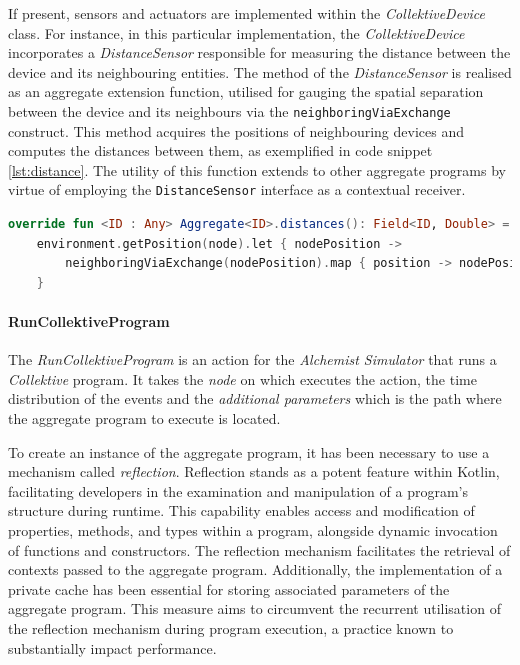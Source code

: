 If present, sensors and actuators are implemented within the \emph{CollektiveDevice} class.
For instance, in this particular implementation, the \emph{CollektiveDevice} incorporates a \emph{DistanceSensor} responsible for
measuring the distance between the device and its neighbouring entities.
The method of the \emph{DistanceSensor} is realised as an aggregate extension function, utilised for gauging the spatial
separation between the device and its neighbours via the \texttt{neighboringViaExchange} construct.
This method acquires the positions of neighbouring devices and computes the distances between them, as exemplified in code snippet \ref{lst:distance}.
The utility of this function extends to other aggregate programs by virtue of employing the \texttt{DistanceSensor} interface as a contextual receiver.

\begin{lstlisting}[language=kt,label={lst:distance},caption={The implementation of the \texttt{distance} function.}]
override fun <ID : Any> Aggregate<ID>.distances(): Field<ID, Double> =
    environment.getPosition(node).let { nodePosition ->
        neighboringViaExchange(nodePosition).map { position -> nodePosition.distanceTo(position) }
    }
\end{lstlisting}

\paragraph{RunCollektiveProgram}
The \emph{RunCollektiveProgram} is an action for the \emph{Alchemist Simulator} that runs a \emph{Collektive} program.
It takes the \emph{node} on which executes the action, the time distribution of the events and the \emph{additional parameters}
which is the path where the aggregate program to execute is located.

To create an instance of the aggregate program, it has been necessary to use a mechanism called \emph{reflection}.
Reflection stands as a potent feature within Kotlin, facilitating developers in the examination and manipulation of a program's structure during runtime.
This capability enables access and modification of properties, methods, and types within a program, alongside dynamic invocation of functions and constructors.
The reflection mechanism facilitates the retrieval of contexts passed to the aggregate program.
Additionally, the implementation of a private cache has been essential for storing associated parameters of the aggregate program.
This measure aims to circumvent the recurrent utilisation of the reflection mechanism during program execution, a practice known to substantially impact performance.

